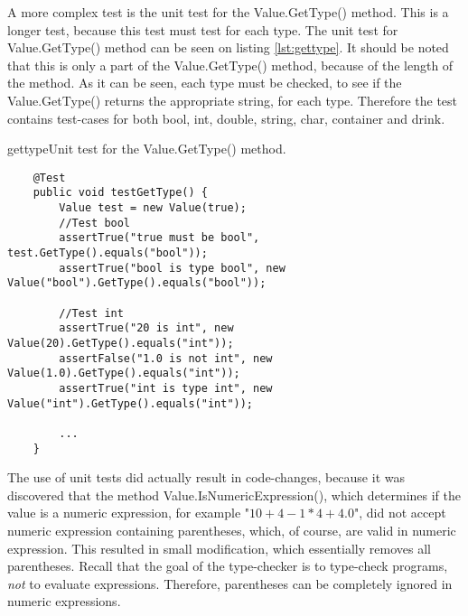 
A more complex test is the unit test for the Value.GetType() method. This is a longer test, because this test must test for each type. The unit test for Value.GetType() method can be seen on listing \ref{lst:gettype}. It should be noted that this is only a part of the Value.GetType() method, because of the length of the method. As it can be seen, each type must be checked, to see if the Value.GetType() returns the appropriate string, for each type. Therefore the test contains test-cases for both bool, int, double, string, char, container and drink. 

\begin{code}{gettype}{Unit test for the Value.GetType() method.}
\begin{lstlisting}
	@Test
	public void testGetType() {
	    Value test = new Value(true);
	    //Test bool
	    assertTrue("true must be bool", test.GetType().equals("bool"));
	    assertTrue("bool is type bool", new Value("bool").GetType().equals("bool"));
	    
	    //Test int
	    assertTrue("20 is int", new Value(20).GetType().equals("int"));
	    assertFalse("1.0 is not int", new Value(1.0).GetType().equals("int"));
	    assertTrue("int is type int", new Value("int").GetType().equals("int"));
	
		...    
	}
\end{lstlisting}
\end{code}

The use of unit tests did actually result in code-changes, because it was discovered that the method Value.IsNumericExpression(), which determines if the value is a numeric expression, for example "$10+4-1*4+4.0$", did not accept numeric expression containing parentheses, which, of course, are valid in numeric expression. This resulted in small modification, which essentially removes all parentheses. Recall that the goal of the type-checker is to type-check programs, \emph{not} to evaluate expressions. Therefore, parentheses can be completely ignored in numeric expressions. 